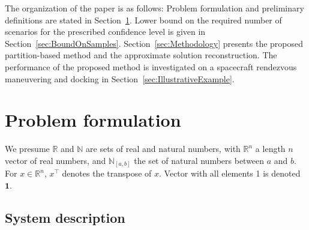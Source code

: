 \documentclass[11pt,letterpaper]{article}
\newcommand{\R}{\mathbb{R}}
\newcommand{\N}{\mathbb{N}}
\begin{document}
    The organization of the paper is as follows:
Problem formulation and preliminary definitions are stated in Section~\ref{sec:ProblemDescription}. Lower bound on the required number of scenarios for the prescribed confidence level is given in Section~\ref{sec:BoundOnSamples}. Section~\ref{sec:Methodology} presents the proposed partition-based method and the approximate solution reconstruction. The performance of the proposed method is investigated on a spacecraft rendezvous maneuvering and docking in Section~\ref{sec:IllustrativeExample}.
	
	
	
	\section{Problem formulation} 
	\label{sec:ProblemDescription}
We presume $\R$ and $\N$ are sets of real and natural numbers, with $\R^{n}$ a length $n$ vector of real numbers,
  and $\N_{[a,b]}$ the set of natural numbers between $a$ and $b$. For $x\in\R^{n}$, $x^{\top}$ denotes the transpose of $x$. {\color{black} Vector with all elements 1 is denoted $\mathbf{1}$.}
 
	
	
	\subsection{System description}
	
\end{document}
